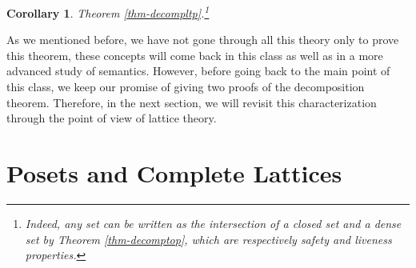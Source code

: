 \documentclass{tufte-handout} %
\newtheorem{cor}[thm]{Corollary}
\theoremstyle{definition}
\theoremstyle{remark}
\newcommand{\0}{\textsf{0}}
\newcommand{\1}{\textsf{1}}
\begin{document}
\begin{cor}
	Theorem \ref{thm-decompltp}.\footnote{Indeed, any set can be written as the intersection of a closed set and a dense set by Theorem \ref{thm-decomptop}, which are respectively safety and liveness properties.}
\end{cor}
As we mentioned before, we have not gone through all this theory only to prove this theorem, these concepts will come back in this class as well as in a more advanced study of semantics. However, before going back to the main point of this class, we keep our promise of giving two proofs of the decomposition theorem. Therefore, in the next section, we will revisit this characterization through the point of view of lattice theory.

\section{Posets and Complete Lattices}
\end{document}
